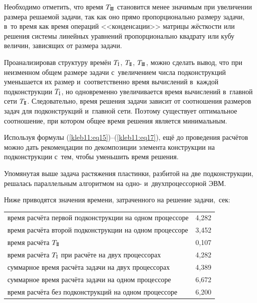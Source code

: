 Необходимо отметить, что время $T_\text{\sc I\!I\!I}$ становится менее значимым при увеличении размера решаемой задачи, так как оно прямо пропорционально размеру задачи, в~то время как время операций <<конденсации>> матрицы жёсткости или решения системы линейных уравнений пропорционально квадрату или кубу величин, зависящих от размера задачи.



Проанализировав структуру времён $T_\text{\sc I}$, $T_\text{\sc I\!I}$, $T_\text{\sc I\!I\!I}$, можно сделать вывод, что при неизменном общем размере задачи с~увеличением числа подконструкций уменьшается их размер и~соответственно время вычислений в~каждой подконструкции $T_\text{\sc I}$, но одновременно увеличивается время вычислений в~главной сети $T_\text{\sc I\!I}$. Следовательно, время решения задачи зависит от соотношения размеров задач для подконструкций и~главной сети. Поэтому существует оптимальное соотношение, при котором общее время решения является минимальным. 

Используя формулы (\ref{kleb11:eq15})--(\ref{kleb11:eq17}), ещё до проведения расчётов можно дать рекомендации по декомпозиции элемента конструкции на подконструкции с~тем, чтобы уменьшить время решения.



Упомянутая выше задача растяжения пластинки, разбитой на две подконструкции, решалась параллельным алгоритмом на одно- и~двухпроцессорной ЭВМ. 

Ниже приводятся значения времени, затраченного на решение задачи,~сек:\\

\hspace{4mm}

\begin{tabular}[b]{p{112mm} l}

время расчёта первой подконструкции на одном процессоре \dotfill & 4,282 \\

время расчёта второй подконструкции на одном процессоре \dotfill & 3,452 \\

время расчёта $T_{\text{\sc I\!I}}$  \dotfill & 0,107 \\

время расчёта $T_{\text{\sc I}}$ при расчёте на двух процессорах \dotfill & 4,282 \\

суммарное время расчёта задачи на двух процессорах \dotfill & 4,389 \\


суммарное время расчёта задачи на одном процессоре \dotfill & 6,672 \\

время расчёта без подконструкций  на одном процессоре \dotfill & 6,200 \\

\end{tabular}





